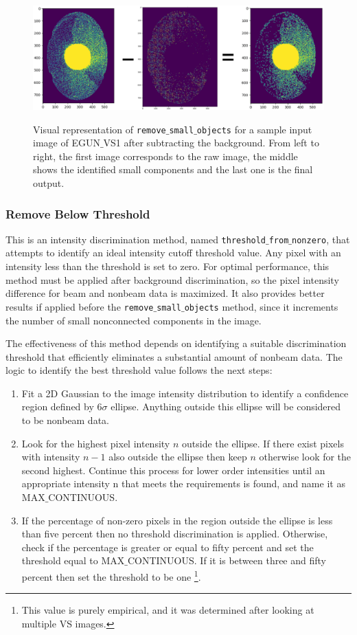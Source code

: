 \documentclass{article}
\begin{document}
\begin{figure}[!h]  
    \centerline{\ \includegraphics[width=0.95\linewidth]{images/third_step.png}}
    \caption{Visual representation of \texttt{remove$\_$small$\_$objects} for a sample input image of EGUN$\_$VS1 after subtracting the background. From left to right, the first image corresponds to the raw image, the middle shows the identified small components and the last one is the final output.}
    \label{fig:11}
\end{figure} 

\newpage
\subsubsection{Remove Below Threshold}

This is an intensity discrimination method, named \texttt{threshold$\_$from$\_$nonzero}, that attempts to identify an ideal intensity cutoff threshold value. Any pixel with an intensity less than the threshold is set to zero. For optimal performance, this method must be applied after background discrimination, so the pixel intensity difference for beam and nonbeam data is maximized. It also provides better results if applied before the \texttt{remove$\_$small$\_$objects} method, since it increments the number of small nonconnected components in the image.

The effectiveness of this method depends on identifying a suitable discrimination threshold that efficiently eliminates a substantial amount of nonbeam data. The logic to identify the best threshold value follows the next steps:
\begin{enumerate}
    \item Fit a 2D Gaussian to the image intensity distribution to identify a confidence region defined by $6 \sigma$ ellipse. Anything outside this ellipse will be considered to be nonbeam data. 
    \item Look for the highest pixel intensity $n$ outside the ellipse. If there exist pixels with intensity $n-1$ also outside the ellipse then keep $n$ otherwise look for the second highest. Continue this process for lower order intensities until an appropriate intensity n that meets the requirements is found, and name it as MAX$\_$CONTINUOUS.
    \item If the percentage of non-zero pixels in the region outside the ellipse is less than five percent then no threshold discrimination is applied. Otherwise, check if the percentage is greater or equal to fifty percent and set the threshold equal to MAX$\_$CONTINUOUS. If it is between three and fifty percent then set the threshold to be one \footnote{This value is purely empirical, and it was determined after looking at multiple VS images.}.   
\end{enumerate}
    
\end{document}

